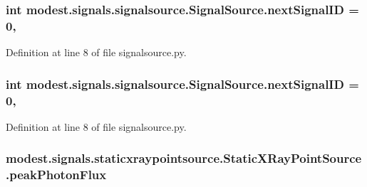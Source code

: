 \subsubsection[{\texorpdfstring{next\+Signal\+ID}{nextSignalID}}]{\setlength{\rightskip}{0pt plus 5cm}int modest.\+signals.\+signalsource.\+Signal\+Source.\+next\+Signal\+ID = 0\hspace{0.3cm}{\ttfamily [static]}, {\ttfamily [inherited]}}\hypertarget{classmodest_1_1signals_1_1signalsource_1_1SignalSource_a453eafb550b551adbec0903deb63dfce}{}\label{classmodest_1_1signals_1_1signalsource_1_1SignalSource_a453eafb550b551adbec0903deb63dfce}


Definition at line 8 of file signalsource.\+py.

\subsubsection[{\texorpdfstring{next\+Signal\+ID}{nextSignalID}}]{\setlength{\rightskip}{0pt plus 5cm}int modest.\+signals.\+signalsource.\+Signal\+Source.\+next\+Signal\+ID = 0\hspace{0.3cm}{\ttfamily [static]}, {\ttfamily [inherited]}}\hypertarget{classmodest_1_1signals_1_1signalsource_1_1SignalSource_a453eafb550b551adbec0903deb63dfce}{}\label{classmodest_1_1signals_1_1signalsource_1_1SignalSource_a453eafb550b551adbec0903deb63dfce}


Definition at line 8 of file signalsource.\+py.

\subsubsection[{\texorpdfstring{peak\+Photon\+Flux}{peakPhotonFlux}}]{\setlength{\rightskip}{0pt plus 5cm}modest.\+signals.\+staticxraypointsource.\+Static\+X\+Ray\+Point\+Source.\+peak\+Photon\+Flux}\hypertarget{classmodest_1_1signals_1_1staticxraypointsource_1_1StaticXRayPointSource_a695992505d7f10fb7d44a7d0f7c6061e}{}\label{classmodest_1_1signals_1_1staticxraypointsource_1_1StaticXRayPointSource_a695992505d7f10fb7d44a7d0f7c6061e}


